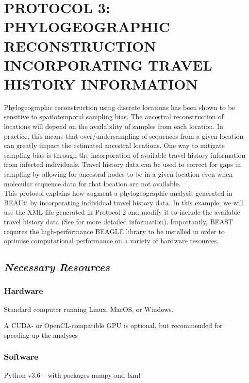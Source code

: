 \documentclass{article}
\begin{document}
\section*{PROTOCOL 3: PHYLOGEOGRAPHIC RECONSTRUCTION INCORPORATING TRAVEL HISTORY INFORMATION}

Phylogeographic reconstruction using discrete locations has been shown to be sensitive to spatiotemporal sampling bias. The ancestral reconstruction of locations will depend on the availability of samples from each location. In practice, this means that over/undersampling of sequences from a given location can greatly impact the estimated ancestral locations. One way to mitigate sampling bias is through the incorporation of available travel history information from infected individuals. Travel history data can be used to correct for gaps in sampling by allowing for ancestral nodes to be in a given location even when molecular sequence data for that location are not available.\\

This protocol explains how augment a phylogeographic analysis generated in BEAUti by incorporating individual travel history data.
In this example, we will use the XML file generated in Protocol 2 and modify it to include the available travel history data (See \cite{travhist} for more detailed information).
Importantly, BEAST requires the high-performance BEAGLE library \cite{beagle3} to be installed in order to optimise computational performance on a variety of hardware resources.

\subsection*{\textbf{\textit{Necessary Resources}}}
\subsubsection*{Hardware}
\hspace{0.5cm}Standard computer running Linux, MacOS, or Windows.

\hspace{0.5cm}A CUDA- or OpenCL-compatible GPU is optional, but recommended for speeding up the analyses

\subsubsection*{Software}
\hspace{0.5cm}Python v3.6+ with packages numpy and lxml
\end{document}
